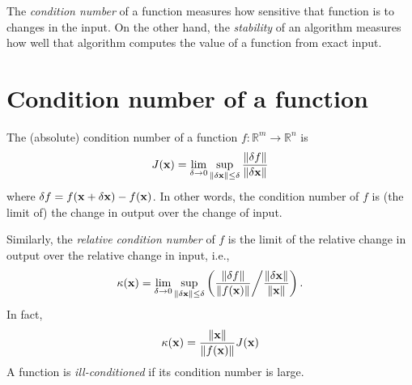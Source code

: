 \label{lab:conditioning_stability}



% 

The \emph{condition number} of a function measures how sensitive that function is to changes in the input.
On the other hand, the \emph{stability} of an algorithm measures how well that algorithm computes the value of a function from exact input.

\section*{Condition number of a function}

The (absolute) condition number of a function $f: \mathbb{R}^m \rightarrow \mathbb{R}^n$ is
 \begin{equation}\label{equ:abs_cond}
J({\bf x}) = \lim_{\delta \rightarrow 0} \sup_{\left\lVert\delta {\bf x}\right\rVert \leq \delta} { \frac{\left\lVert\delta f\right\rVert}{\left\lVert\delta {\bf x}\right\rVert} } 
\end{equation}
where $\delta f = f({\bf x}+\delta{\bf x})-f({\bf x})$.
In other words, the condition number of $f$ is (the limit of) the change in output over the change of input.

Similarly, the \emph{relative condition number} of $f$ is the limit of the relative change in output over the relative change in input, i.e.,
\begin{equation}\label{equ:rel_cond}
\kappa({\bf x}) = \lim_{\delta \rightarrow 0} \sup_{\left\lVert\delta {\bf x}\right\rVert \leq \delta} \left({ \frac{\left\lVert\delta f\right\rVert}{\left\lVert f({\bf x})\right\rVert} } \middle/ { \frac{\left\lVert\delta {\bf x}\right\rVert}{\left\lVert{\bf x}\right\rVert} }\right).
\end{equation}
In fact,
\[
\kappa({\bf x}) = \frac{\left\lVert{\bf x}\right\rVert}{\left\lVert f({\bf x})\right\rVert} J({\bf x})
\]
A function is \emph{ill-conditioned} if its condition number is large.


